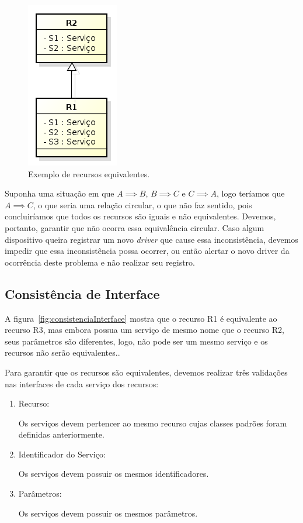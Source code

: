 \begin{figure}[ht]
	\center
	\includegraphics[scale=0.6]{imagens/equivalenciaDeRecursos}
	\caption{Exemplo de recursos equivalentes.}
	\label{fig:equivalenciaDeRecursos}
\end{figure}

Suponha uma situação em que $A \implies B$, $B \implies C$ e $C \implies A$, logo teríamos que $A \implies C$, o que seria uma relação circular, o que não faz sentido, pois concluiríamos que todos os recursos são iguais e não equivalentes. Devemos, portanto, garantir que não ocorra essa equivalência circular. Caso algum dispositivo queira registrar um novo \emph{driver} que cause essa inconsistência, devemos impedir que essa inconsistência possa ocorrer, ou então alertar o novo driver da ocorrência deste problema e não realizar seu registro. 

\subsection{Consistência de Interface}

	A figura~\ref{fig:consistenciaInterface} mostra que o recurso R1 é equivalente ao recurso R3, mas embora possua um serviço de mesmo nome que o recurso R2,  seus parâmetros são diferentes, logo, não pode ser um mesmo serviço e os recursos não serão equivalentes..
	
	Para garantir que os recursos são equivalentes, devemos realizar três validações nas interfaces de cada serviço dos recursos:
	\begin{enumerate}
		\item Recurso:
			
			Os serviços devem pertencer ao mesmo recurso cujas classes padrões foram definidas anteriormente.
		
		\item Identificador do Serviço:

			Os serviços devem possuir os mesmos identificadores.

		\item Parâmetros:

			Os serviços devem possuir os mesmos parâmetros.
	\end{enumerate}

